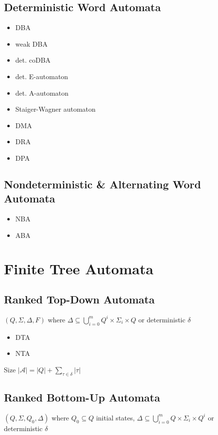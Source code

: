 \documentclass{article}
\begin{document}
\subsection{Deterministic Word Automata}
\begin{itemize}
	\item DBA
	\item weak DBA
	\item det. coDBA
	\item det. E-automaton
	\item det. A-automaton
	\item Staiger-Wagner automaton
	\item DMA
	\item DRA
	\item DPA
\end{itemize}

\subsection{Nondeterministic \& Alternating Word Automata}
\begin{itemize}
	\item NBA
	\item ABA
\end{itemize}



\newpage
\section{Finite Tree Automata}
\subsection{Ranked Top-Down Automata}
$(Q, \Sigma, \Delta, F)$ where $\Delta \subseteq \bigcup\limits_{i=0}^m Q^i \times \Sigma_i \times Q$ or deterministic $\delta$

\begin{itemize}
	\item DTA
	\item NTA
\end{itemize}

Size $|\mathcal{A}| = |Q| + \sum\limits_{\tau \in \delta} |\tau|$

\subsection{Ranked Bottom-Up Automata}
$(Q, \Sigma, Q_0, \Delta)$ where $Q_0 \subseteq Q$ initial states, $\Delta \subseteq \bigcup\limits_{i=0}^m Q \times \Sigma_i \times Q^i$ or deterministic $\delta$
\end{document}
